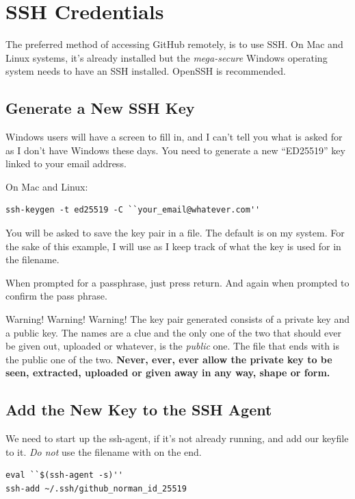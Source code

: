 \chapter{SSH Credentials}\label{chap: Ssh Credentials}

The preferred method of accessing GitHub remotely, is to use SSH. On Mac and Linux systems, it's already installed but the \emph{mega-secure} Windows operating system needs to have an SSH installed. OpenSSH is recommended.

\section{Generate a New SSH Key}

Windows users will have a screen to fill in, and I can't tell you what is asked for as I don't have Windows these days. You need to generate a new ``ED25519'' key linked to your email address.

On Mac and Linux:

\begin{lstlisting}
ssh-keygen -t ed25519 -C ``your_email@whatever.com''
\end{lstlisting}

You will be asked to save the key pair in a file. The default is  on my system. For the sake of this example, I will use   as I keep track of what the key is used for in the filename.

When prompted for a passphrase, just press return. And again when prompted to confirm the pass phrase.

\begin{tips}{Warning! Warning! Warning!}
    The key pair generated consists of a private key and a public key. The names are a clue and the only one of the two that should ever be given out, uploaded or whatever, is the \emph{public} one. The file that ends with  is the public one of the two.
    \textbf{Never, ever, ever allow the private key to be seen, extracted, uploaded or given away in any way, shape or form.}
\end{tips}

\section{Add the New Key to the SSH Agent}

We need to start up the ssh-agent, if it's not already running, and add our keyfile to it. \emph{Do not} use the filename with  on the end.
\begin{lstlisting}
eval ``$(ssh-agent -s)''
ssh-add ~/.ssh/github_norman_id_25519
\end{lstlisting}

